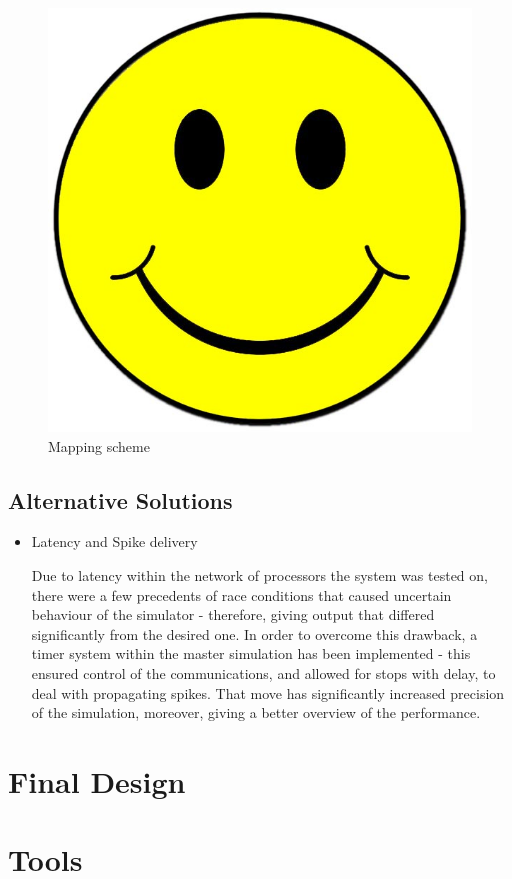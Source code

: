 \begin{figure}[h]
\begin{center}
\includegraphics[scale = 0.1]{images/placeholder.jpg}
\end{center}
\caption{Mapping scheme}
\end{figure}

\subsection{Alternative Solutions}
\begin{itemize}

\item {Latency and Spike delivery}

Due to latency within the network of processors the system was tested on, there were a few precedents of race conditions that caused uncertain behaviour of the simulator - therefore, giving output that differed significantly from the desired one. In order to overcome this drawback, a timer system within the master simulation has been implemented - this ensured control of the communications, and allowed for stops with delay, to deal with propagating spikes. That move has significantly increased precision of the simulation, moreover, giving a better overview of the performance.

\end{itemize}


\section{Final Design}

\section{Tools}
